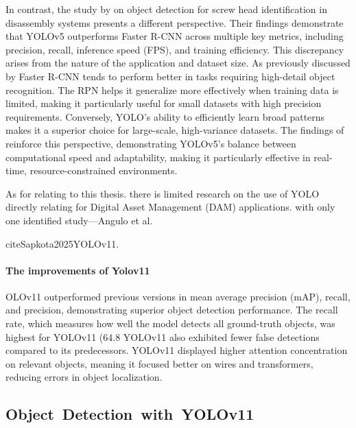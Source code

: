 \documentclass[a4paper,10pt,twocolumn]{article}
\numberwithin{figure}{section}
\numberwithin{table}{section}
\begin{document}
   In contrast, the study by \cite{KARBOUJ2024527} on object detection for screw head identification 
   in disassembly systems presents a different perspective. Their findings demonstrate that 
   YOLOv5 outperforms Faster R-CNN across multiple key metrics, including precision, recall, 
   inference speed (FPS), and training efficiency. This discrepancy arises from the nature of
   the application and dataset size. As previously discussed by \cite{articleRANE} Faster R-CNN tends to perform 
   better in tasks requiring high-detail object recognition. The RPN helps it generalize
   more effectively when training data is limited, making it 
   particularly useful for small datasets 
   with high precision requirements.
   Conversely, YOLO's ability to efficiently learn broad patterns makes it a superior choice for 
   large-scale, high-variance datasets. The findings of \cite{KARBOUJ2024527} reinforce this perspective, 
   demonstrating YOLOv5’s balance between computational speed and adaptability, making it 
   particularly effective in real-time, resource-constrained environments.







\citep{alif2025yolov12}




 As for relating to this thesis. there is limited research on the use of YOLO 
directly relating for Digital Asset Management (DAM) applications. 
with only one identified 
study—Angulo et al. 


cite{Sapkota2025YOLOv11}. 


\paragraph{The improvements of Yolov11}


OLOv11 outperformed previous versions in mean average precision (mAP), recall, and precision, demonstrating superior object detection performance.
The recall rate, which measures how well the model detects all ground-truth objects, was highest for YOLOv11 (64.8%
YOLOv11 also exhibited fewer false detections compared to its predecessors.
YOLOv11 displayed higher attention concentration on relevant objects, meaning it focused better on wires and transformers, reducing errors in object localization.


\subsection{\mbox{Object Detection with YOLOv11}}
\end{document}
